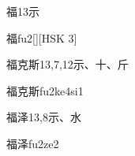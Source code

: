 \begin{entry}{福}{13}{⽰}
  \begin{phonetics}{福}{fu2}[][HSK 3]
  \end{phonetics}
\end{entry}

\begin{entry}{福克斯}{13,7,12}{⽰、⼗、⽄}
  \begin{phonetics}{福克斯}{fu2ke4si1}
  \end{phonetics}
\end{entry}

\begin{entry}{福泽}{13,8}{⽰、⽔}
  \begin{phonetics}{福泽}{fu2ze2}
  \end{phonetics}
\end{entry}


